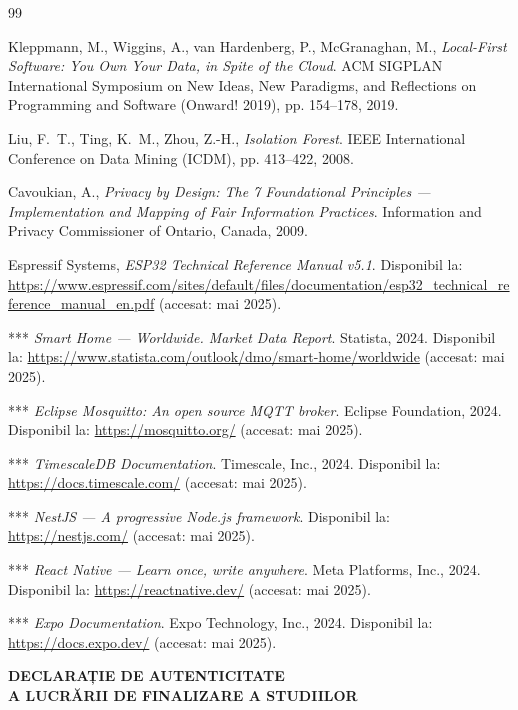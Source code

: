 \documentclass[12pt, twoside, a4paper]{report}
\begin{document}
\begin{thebibliography}{99}

Kleppmann, M., Wiggins, A., van Hardenberg, P., McGranaghan, M.,
\textit{Local-First Software: You Own Your Data, in Spite of the Cloud}.
ACM SIGPLAN International Symposium on New Ideas, New Paradigms, and
Reflections on Programming and Software (Onward! 2019), pp. 154--178, 2019.

Liu, F.~T., Ting, K.~M., Zhou, Z.-H.,
\textit{Isolation Forest}.
IEEE International Conference on Data Mining (ICDM), pp. 413--422, 2008.

Cavoukian, A.,
\textit{Privacy by Design: The 7 Foundational Principles --- Implementation and
Mapping of Fair Information Practices}.
Information and Privacy Commissioner of Ontario, Canada, 2009.

Espressif Systems,
\textit{ESP32 Technical Reference Manual v5.1}.
Disponibil la: \url{https://www.espressif.com/sites/default/files/documentation/esp32_technical_reference_manual_en.pdf}
(accesat: mai 2025).

*** \textit{Smart Home --- Worldwide. Market Data Report}.
Statista, 2024.
Disponibil la: \url{https://www.statista.com/outlook/dmo/smart-home/worldwide}
(accesat: mai 2025).

*** \textit{Eclipse Mosquitto: An open source MQTT broker}.
Eclipse Foundation, 2024.
Disponibil la: \url{https://mosquitto.org/}
(accesat: mai 2025).

*** \textit{TimescaleDB Documentation}.
Timescale, Inc., 2024.
Disponibil la: \url{https://docs.timescale.com/}
(accesat: mai 2025).

*** \textit{NestJS --- A progressive Node.js framework}.
Disponibil la: \url{https://nestjs.com/}
(accesat: mai 2025).

*** \textit{React Native --- Learn once, write anywhere}.
Meta Platforms, Inc., 2024.
Disponibil la: \url{https://reactnative.dev/}
(accesat: mai 2025).

*** \textit{Expo Documentation}.
Expo Technology, Inc., 2024.
Disponibil la: \url{https://docs.expo.dev/}
(accesat: mai 2025).

\end{thebibliography}


\newpage
\thispagestyle{empty}
\begin{center}
{\large\bfseries DECLARAȚIE DE AUTENTICITATE\\[4pt]
A LUCRĂRII DE FINALIZARE A STUDIILOR}
\end{center}
\end{document}
